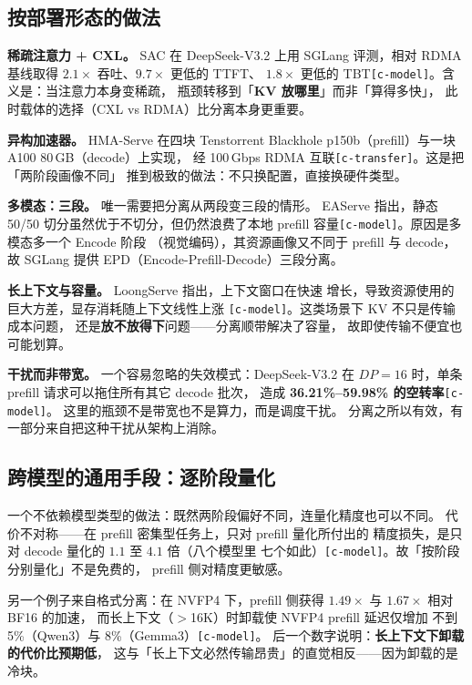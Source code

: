 \subsection{按部署形态的做法}

\noindent\textbf{稀疏注意力 + CXL。} SAC 在 DeepSeek-V3.2 上用 SGLang
评测，相对 RDMA 基线取得 $2.1\times$ 吞吐、$9.7\times$ 更低的 TTFT、
$1.8\times$ 更低的 TBT\texttt{[c-model]}。含义是：当注意力本身变稀疏，
瓶颈转移到「\textbf{KV 放哪里}」而非「算得多快」，
此时载体的选择（CXL vs RDMA）比分离本身更重要。

\noindent\textbf{异构加速器。} HMA-Serve 在四块 Tenstorrent Blackhole
p150b（prefill）与一块 A100 80\,GB（decode）上实现，
经 100\,Gbps RDMA 互联\texttt{[c-transfer]}。这是把「两阶段画像不同」
推到极致的做法：不只换配置，直接换硬件类型。

\noindent\textbf{多模态：三段。} 唯一需要把分离从两段变三段的情形。
EAServe 指出，静态 50/50 切分虽然优于不切分，但仍然浪费了本地
prefill 容量\texttt{[c-model]}。原因是多模态多一个 Encode 阶段
（视觉编码），其资源画像又不同于 prefill 与 decode，
故 SGLang 提供 EPD（Encode-Prefill-Decode）三段分离。

\noindent\textbf{长上下文与容量。} LoongServe 指出，上下文窗口在快速
增长，导致资源使用的巨大方差，显存消耗随上下文线性上涨
\texttt{[c-model]}。这类场景下 KV 不只是传输成本问题，
还是\textbf{放不放得下}问题——分离顺带解决了容量，
故即使传输不便宜也可能划算。

\noindent\textbf{干扰而非带宽。} 一个容易忽略的失效模式：DeepSeek-V3.2
在 $DP=16$ 时，单条 prefill 请求可以拖住所有其它 decode 批次，
造成 \textbf{36.21\%--59.98\% 的空转率}\texttt{[c-model]}。
这里的瓶颈不是带宽也不是算力，而是调度干扰。
分离之所以有效，有一部分来自把这种干扰从架构上消除。

\subsection{跨模型的通用手段：逐阶段量化}

一个不依赖模型类型的做法：既然两阶段偏好不同，连量化精度也可以不同。
代价不对称——在 prefill 密集型任务上，只对 prefill 量化所付出的
精度损失，是只对 decode 量化的 $1.1$ 至 $4.1$ 倍（八个模型里
七个如此）\texttt{[c-model]}。故「按阶段分别量化」不是免费的，
prefill 侧对精度更敏感。

另一个例子来自格式分离：在 NVFP4 下，prefill 侧获得
$1.49\times$ 与 $1.67\times$ 相对 BF16 的加速，
而长上下文（$>$16K）时卸载使 NVFP4 prefill 延迟仅增加
不到 5\%（Qwen3）与 8\%（Gemma3）\texttt{[c-model]}。
后一个数字说明：\textbf{长上下文下卸载的代价比预期低}，
这与「长上下文必然传输昂贵」的直觉相反——因为卸载的是冷块。

